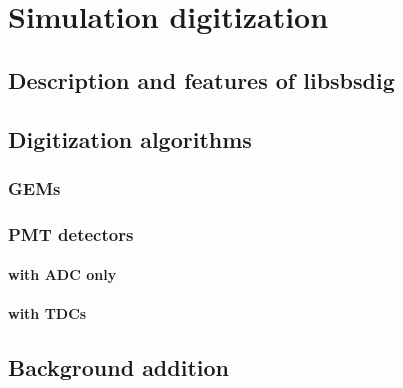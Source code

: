 \section{Simulation digitization}

\subsection{Description and features of libsbsdig }

\subsection{Digitization algorithms}

\subsubsection{GEMs}

\subsubsection{PMT detectors}

\paragraph{with ADC only}

\paragraph{with TDCs}

\subsection{Background addition}
